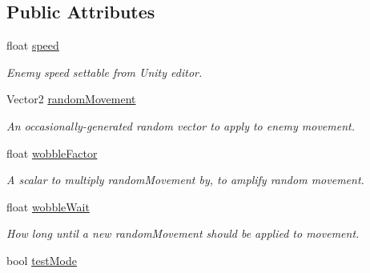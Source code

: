 \subsection*{Public Attributes}
\begin{DoxyCompactItemize}
\item 
\mbox{\label{class_enemy_behavior_a1c7f38d162cec582d736b2b7d7d0ac6b}} 
float \mbox{\hyperlink{class_enemy_behavior_a1c7f38d162cec582d736b2b7d7d0ac6b}{speed}}
\begin{DoxyCompactList}\small\item\em Enemy speed settable from Unity editor. \end{DoxyCompactList}\item 
\mbox{\label{class_enemy_behavior_a6f9339ebbcc8c5ad4e538d52bfde73c1}} 
Vector2 \mbox{\hyperlink{class_enemy_behavior_a6f9339ebbcc8c5ad4e538d52bfde73c1}{random\+Movement}}
\begin{DoxyCompactList}\small\item\em An occasionally-\/generated random vector to apply to enemy movement. \end{DoxyCompactList}\item 
\mbox{\label{class_enemy_behavior_a80484f747dfb85a8063a50dd115f65e0}} 
float \mbox{\hyperlink{class_enemy_behavior_a80484f747dfb85a8063a50dd115f65e0}{wobble\+Factor}}
\begin{DoxyCompactList}\small\item\em A scalar to multiply random\+Movement by, to amplify random movement. \end{DoxyCompactList}\item 
\mbox{\label{class_enemy_behavior_ade5bcff77085ea22523d28312c252d75}} 
float \mbox{\hyperlink{class_enemy_behavior_ade5bcff77085ea22523d28312c252d75}{wobble\+Wait}}
\begin{DoxyCompactList}\small\item\em How long until a new random\+Movement should be applied to movement. \end{DoxyCompactList}\item 
\mbox{\label{class_enemy_behavior_af8c760cde02386745dc1017af509049d}} 
bool \mbox{\hyperlink{class_enemy_behavior_af8c760cde02386745dc1017af509049d}{test\+Mode}}

\end{DoxyCompactItemize}
